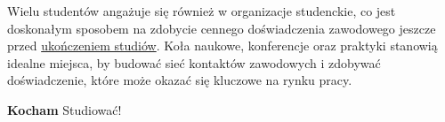 Wielu studentów angażuje się również w organizacje studenckie, co jest doskonałym sposobem na zdobycie cennego doświadczenia zawodowego jeszcze przed \underline{ukończeniem studiów}. Koła naukowe, konferencje oraz praktyki stanowią idealne miejsca, by budować sieć kontaktów zawodowych i zdobywać doświadczenie, które może okazać się kluczowe na rynku pracy.

\noindent \textbf{Kocham} Studiować! 